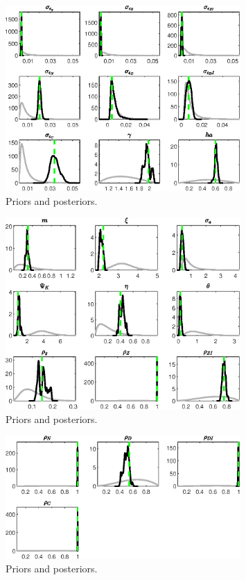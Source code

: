  
\begin{figure}[H]
\centering
\includegraphics[width=0.80\textwidth]{BRS_growth_KPR/Output/BRS_growth_KPR_PriorsAndPosteriors1}
\caption{Priors and posteriors.}\label{Fig:PriorsAndPosteriors:1}
\end{figure}
 
\begin{figure}[H]
\centering
\includegraphics[width=0.80\textwidth]{BRS_growth_KPR/Output/BRS_growth_KPR_PriorsAndPosteriors2}
\caption{Priors and posteriors.}\label{Fig:PriorsAndPosteriors:2}
\end{figure}
 
\begin{figure}[H]
\centering
\includegraphics[width=0.80\textwidth]{BRS_growth_KPR/Output/BRS_growth_KPR_PriorsAndPosteriors3}
\caption{Priors and posteriors.}\label{Fig:PriorsAndPosteriors:3}
\end{figure}
 
